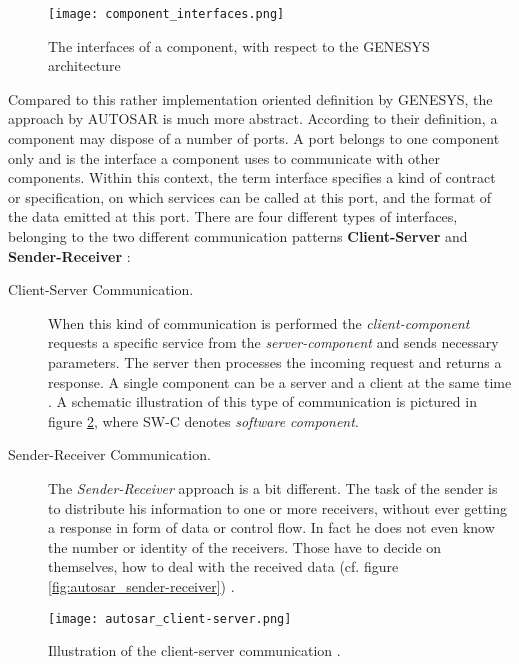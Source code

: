 \begin{figure}[!htbp]
\centering
\texttt{[image: component\_interfaces.png]}
\caption{The interfaces of a component, with respect to the GENESYS architecture \cite[p.40]{genesys}}
\label{fig:component_interfaces}
\end{figure}

Compared to this rather implementation oriented definition by GENESYS, the approach by AUTOSAR is much more abstract. According to their definition, a component may dispose of a number of ports. A port belongs to one component only and is the interface a component uses to communicate with other components. Within this context, the term interface specifies a kind of contract or specification, on which services can be called at this port, and the format of the data emitted at this port. There are four different types of interfaces, belonging to the two different communication patterns \textbf{Client-Server} and \textbf{Sender-Receiver} \cite{autosar_intro}:

\begin{description}
\item [Client-Server Communication.]
When this kind of communication is performed the \emph{client-component} requests a specific service from the \emph{server-component} and sends necessary parameters. The server then processes the incoming request and returns a response. A single component can be a server and a client at the same time \cite{autosar_intro}. A schematic illustration of this type of communication is pictured in figure \ref{fig:autosar_client-server}, where SW-C denotes \emph{software component}.

\item [Sender-Receiver Communication.]
The \emph{Sender-Receiver} approach is a bit different. The task of the sender is to distribute his information to one or more receivers, without ever getting a response in form of data or control flow. In fact he does not even know the number or identity of the receivers. Those have to decide on themselves, how to deal with the received data (cf. figure \ref{fig:autosar_sender-receiver}) \cite{autosar_intro}.
\end{description}

\begin{figure}[!htbp]
\centering
\texttt{[image: autosar\_client-server.png]}
\caption{Illustration of the client-server communication \cite{autosar_intro}.}
\label{fig:autosar_client-server}
\end{figure}

